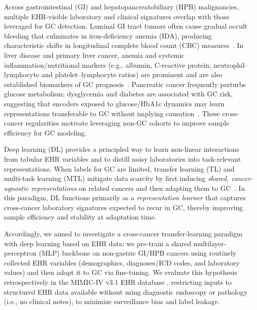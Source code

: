 \documentclass[diagnostics,article,submit,pdftex,moreauthors]{Definitions/mdpi}
\begin{document}
Across gastrointestinal (GI) and hepatopancreatobiliary (HPB) malignancies, multiple EHR-visible laboratory and clinical signatures overlap with those leveraged for GC detection. 
Luminal GI tract tumors often cause gradual occult bleeding that culminates in iron-deficiency anemia (IDA), producing characteristic shifts in longitudinal complete blood count (CBC) measures~\citep{read2023cancers,Aksoy2019CBC,Krieg2024IDA,Kim2014GIBleed}. 
In liver disease and primary liver cancer, anemia and systemic inflammation/nutritional markers (e.g., albumin, C-reactive protein, neutrophil–lymphocyte and platelet–lymphocyte ratios) are prominent and are also established biomarkers of GC prognosis~\citep{Stein2016Anemia,Gkamprela2017CLDIDA,Crumley2010Albumin,Kim2020Inflam}. 
Pancreatic cancer frequently perturbs glucose metabolism; dysglycemia and diabetes are associated with GC risk, suggesting that encoders exposed to glucose/HbA1c dynamics may learn representations transferable to GC without implying causation~\citep{Shimoyama2013DMGC,Yoon2013DMGC,Guo2022DMGC}. 
These cross-cancer regularities motivate leveraging non-GC cohorts to improve sample efficiency for GC modeling.

Deep learning (DL) provides a principled way to learn non-linear interactions from tabular EHR variables and to distill noisy laboratories into task-relevant representations. 
When labels for GC are limited, transfer learning (TL) and multi-task learning (MTL) mitigate data scarcity by first inducing \emph{shared, cancer-agnostic representations} on related cancers and then adapting them to GC~\citep{Caruana1997_MTL,Pan2010_TLsurvey,Yosinski2014_transferable}. 
In this paradigm, DL functions primarily as a \emph{representation learner} that captures cross-cancer laboratory signatures expected to recur in GC, thereby improving sample efficiency and stability at adaptation time.

Accordingly, we aimed to investigate a cross-cancer transfer-learning paradigm with deep learning based on EHR data: we pre-train a shared multilayer-perceptron (MLP) backbone on non-gastric GI/HPB cancers using routinely collected EHR variables (demographics, diagnoses/ICD codes, and laboratory values) and then adapt it to GC via fine-tuning. 
We evaluate this hypothesis retrospectively in the MIMIC-IV v3.1 EHR database \citep{Johnson2024MIMICIV}, restricting inputs to structured EHR data available without using diagnostic endoscopy or pathology (i.e., no clinical notes), to minimize surveillance bias and label leakage.
\end{document}
